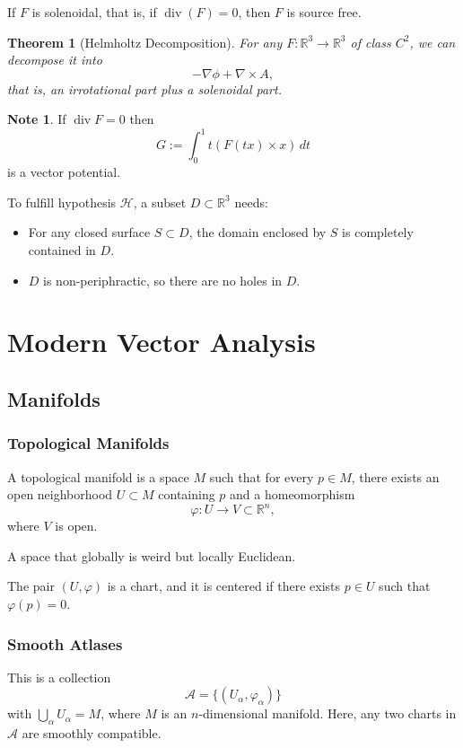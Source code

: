 \documentclass[11pt]{report}
\theoremstyle{definition}
\newtheorem{note}[definition]{Note}
\theoremstyle{plain}
\newtheorem{theorem}[definition]{Theorem}
\theoremstyle{remark}
\newcommand{\R}{\mathbb{R}}
\newcommand{\grad}{\nabla}
\newcommand{\divergence}{\operatorname{div}}
\begin{document}
If $F$ is solenoidal, that is, if $\divergence(F)=0$, then $F$ is source free.

\begin{theorem}[Helmholtz Decomposition]
For any $F:\R^3\to \R^3$ of class $C^2$, we can decompose it into
\[
-\grad\phi+\grad\times A,
\]
that is, an irrotational part plus a solenoidal part.
\end{theorem}

\begin{note}
If $\divergence F=0$ then
\[
G:=\int_0^1 t(F(tx)\times x)\,dt
\]
is a vector potential.
\end{note}

To fulfill hypothesis $\mathcal{H}$, a subset $D\subset \R^3$ needs:
\begin{itemize}
    \item For any closed surface $S\subset D$, the domain enclosed by $S$ is completely contained in $D$.
    \item $D$ is non-periphractic, so there are no holes in $D$.
\end{itemize}

\part{Modern Vector Analysis}

\chapter{Manifolds}

\section{Topological Manifolds}

A topological manifold is a space $M$ such that for every $p\in M$, there exists an open neighborhood $U\subset M$ containing $p$ and a homeomorphism
\[
\varphi:U\to V\subset \R^n,
\]
where $V$ is open.

A space that globally is weird but locally Euclidean.

The pair $(U,\varphi)$ is a chart, and it is centered if there exists $p\in U$ such that $\varphi(p)=0$.

\section{Smooth Atlases}

This is a collection
\[
\mathcal A=\{(U_\alpha,\varphi_\alpha)\}
\]
with $\bigcup_\alpha U_\alpha=M$, where $M$ is an $n$-dimensional manifold. Here, any two charts in $\mathcal A$ are smoothly compatible.
\end{document}
